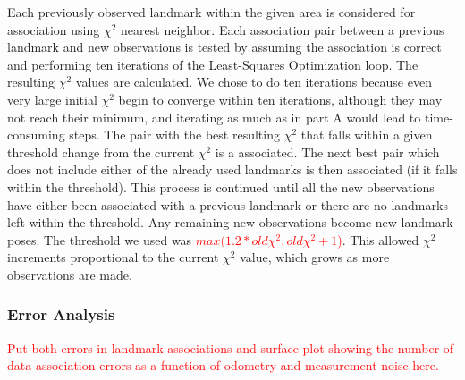 \documentclass[12pt]{article}
\begin{document}
Each previously observed landmark within the given area is considered for association using $\chi^2$ nearest neighbor.  Each association pair between a previous landmark and new observations is tested by assuming the association is correct and performing ten iterations of the Least-Squares Optimization loop.  The resulting $\chi^2$ values are calculated.  We chose to do ten iterations because even very large initial $\chi^2$ begin to converge within ten iterations, although they may not reach their minimum, and iterating as much as in part A would lead to time-consuming steps.  The pair with the best resulting $\chi^2$ that falls within a given threshold change from the current $\chi^2$ is a associated.  The next best pair which does not include either of the already used landmarks is then associated (if it falls within the threshold).  This process is continued until all the new observations have either been associated with a previous landmark or there are no landmarks left within the threshold.  Any remaining new observations become new landmark poses.  The threshold we used was \textcolor{red}{$max(1.2*old\chi^2, old\chi^2 + 1$)}.  This allowed $\chi^2$ increments proportional to the current $\chi^2$ value, which grows as more observations are made.


\subsubsection*{Error Analysis}

\textcolor{red}{Put both errors in landmark associations and surface plot showing the number of data association errors as a function of odometry and measurement noise here.}
\end{document}
